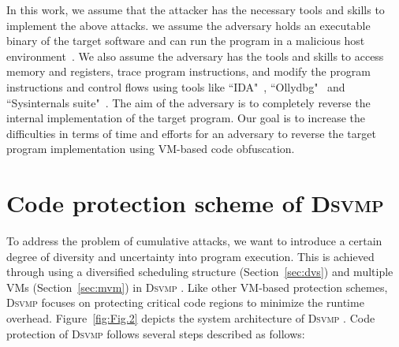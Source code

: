 \documentclass[times]{secauth}
\newcommand{\DSVMP}{\textsc{Dsvmp }}
\begin{document}
In this work, we assume that the attacker has the necessary tools and skills to implement the above attacks.
we assume the adversary holds an executable binary of the
target software and can run the program in a malicious host
environment~\cite{11collberg2002watermarking}. We also assume the adversary
has the tools and skills to access memory and registers, trace program
instructions, and modify the program instructions and control flows using
tools like ``IDA"~\cite{14Idapro}, ``Ollydbg"~\cite{15Ollydbg} and
``Sysinternals suite"~\cite{16Sysinternalssuite}. The aim of the adversary is
to completely reverse the internal implementation of the target program.
Our goal is to increase the difficulties in terms of time and efforts for an adversary to
reverse the target program implementation using VM-based code obfuscation.



\section{Code protection scheme of \DSVMP\label{sec:overview}}
To address the problem of cumulative attacks, we want to introduce a certain
degree of diversity and uncertainty into program execution. This is achieved
through using a diversified scheduling structure (Section~\ref {sec:dvs}) and
multiple VMs (Section~\ref {sec:mvm}) in \DSVMP. Like other VM-based protection schemes,
\DSVMP focuses on protecting critical code regions to minimize the runtime overhead.
Figure~\ref{fig:Fig.2} depicts the system architecture of \DSVMP.
Code protection of \DSVMP follows several steps described as follows:
\end{document}
